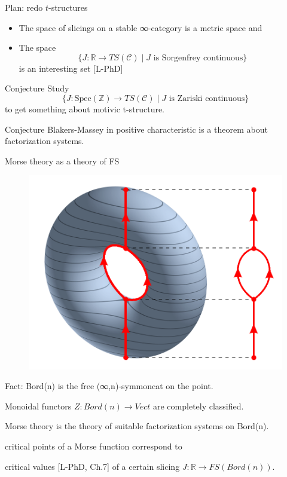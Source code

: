 \documentclass{beamer}
\begin{document}
\begin{frame}{Plan: redo $t$-structures}\small
   \begin{itemize}
     \item<+-> The space of \alert{slicings} on a stable ∞-category is a metric space and

     \item<+-> The space \[\{ J \colon \mathbb R \to TS(\mathcal C) \mid J \text{ is Sorgenfrey continuous} \}\]
     is an interesting set [\alert{L-PhD}]
    \end{itemize}

    \onslide<+->
    \begin{block}{Conjecture}
\vspace{.5mm}
  Study
\[\{ J \colon \text{Spec}(\mathbb Z) \to TS(\mathcal C) \mid J \text{ is Zariski continuous} \}\]
to get something about motivic t-structure.
 \end{block}
 \onslide<+->
 \begin{block}{Conjecture}
\vspace{.5mm}
 Blakers-Massey in positive characteristic is a theorem about factorization systems.
 \end{block}
\end{frame}
%
%
%
%
\begin{frame}{Morse theory as a theory of FS}
  \begin{figure}
\includegraphics[scale=.15]{3D-Leveltorus-Reebgraph.png}
  \end{figure}

  Fact: Bord(n) is the free (∞,n)-symmoncat on the point.

  \vspace{1cm}
  Monoidal functors $Z : Bord(n) \to Vect$ are completely classified.

  \vspace{1cm}
  \onslide<+->
  Morse theory is the theory of suitable factorization systems on Bord(n).

  \alert{critical points of a Morse function}
  correspond to

 \alert{critical values} [\alert{L-PhD}, Ch.7] of a certain slicing $J : \mathbb R \to FS(Bord(n))$.
\end{frame}
\end{document}
